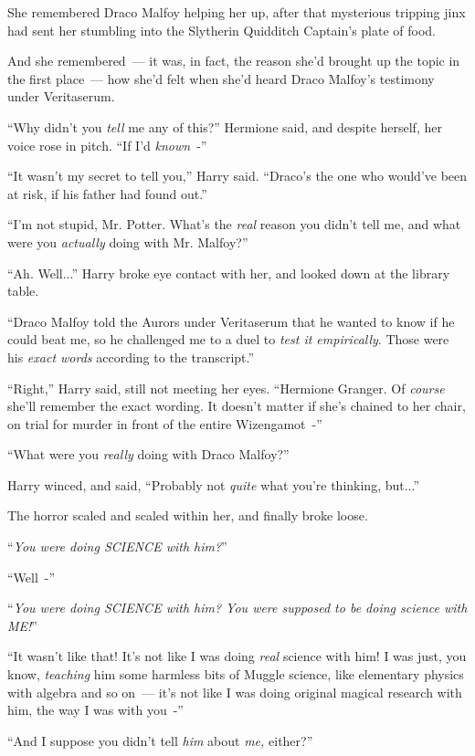 She remembered Draco Malfoy helping her up, after that mysterious tripping jinx had sent her stumbling into the Slytherin Quidditch Captain's plate of food.

And she remembered~--- it was, in fact, the reason she'd brought up the topic in the first place~--- how she'd felt when she'd heard Draco Malfoy's testimony under Veritaserum.

``Why didn't you \emph{tell} me any of this?'' Hermione said, and despite herself, her voice rose in pitch. ``If I'd \emph{known}~-''

``It wasn't my secret to tell you,'' Harry said. ``Draco's the one who would've been at risk, if his father had found out.''

``I'm not stupid, Mr. Potter. What's the \emph{real} reason you didn't tell me, and what were you \emph{actually} doing with Mr. Malfoy?''

``Ah. Well...'' Harry broke eye contact with her, and looked down at the library table.

``Draco Malfoy told the Aurors under Veritaserum that he wanted to know if he could beat me, so he challenged me to a duel to \emph{test it empirically}. Those were his \emph{exact words} according to the transcript.''

``Right,'' Harry said, still not meeting her eyes. ``Hermione Granger. Of \emph{course} she'll remember the exact wording. It doesn't matter if she's chained to her chair, on trial for murder in front of the entire Wizengamot~-''

``What were you \emph{really} doing with Draco Malfoy?''

Harry winced, and said, ``Probably not \emph{quite} what you're thinking, but...''

The horror scaled and scaled within her, and finally broke loose.

``\emph{You were doing SCIENCE with him?}''

``Well~-''

``\emph{You were doing SCIENCE with him? You were supposed to be doing science with ME!}''

``It wasn't like that! It's not like I was doing \emph{real} science with him! I was just, you know, \emph{teaching} him some harmless bits of Muggle science, like elementary physics with algebra and so on~--- it's not like I was doing original magical research with him, the way I was with you~-''

``And I suppose you didn't tell \emph{him} about \emph{me,} either?''

